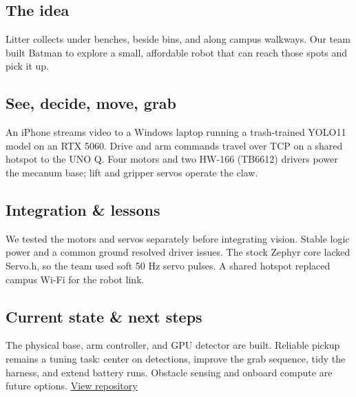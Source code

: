 \subsection*{The idea}
Litter collects under benches, beside bins, and along campus walkways. Our team built Batman to explore a small, affordable robot that can reach those spots and pick it up.
\subsection*{See, decide, move, grab}
An iPhone streams video to a Windows laptop running a trash-trained YOLO11 model on an RTX 5060. Drive and arm commands travel over TCP on a shared hotspot to the UNO Q. Four motors and two HW-166 (TB6612) drivers power the mecanum base; lift and gripper servos operate the claw.
\subsection*{Integration \& lessons}
We tested the motors and servos separately before integrating vision. Stable logic power and a common ground resolved driver issues. The stock Zephyr core lacked Servo.h, so the team used soft 50 Hz servo pulses. A shared hotspot replaced campus Wi-Fi for the robot link.
\subsection*{Current state \& next steps}
The physical base, arm controller, and GPU detector are built. Reliable pickup remains a tuning task: center on detections, improve the grab sequence, tidy the harness, and extend battery runs. Obstacle sensing and onboard compute are future options.
\medskip\href{https://github.com/muhammadmaalik/Batman}{View repository}